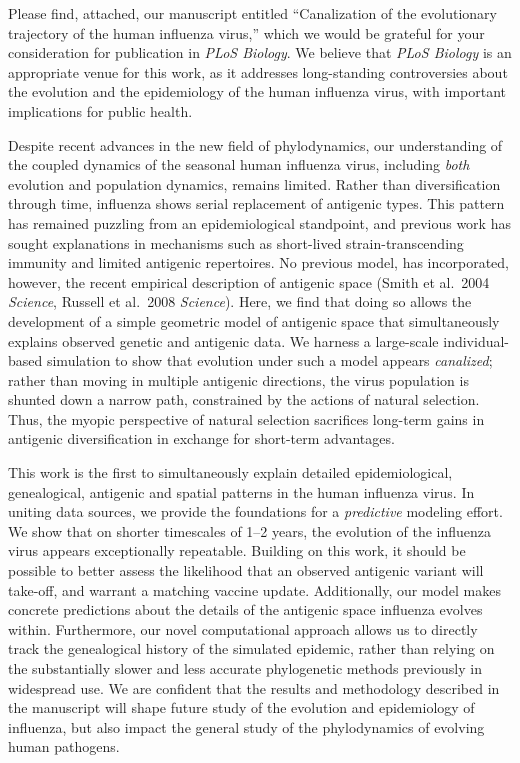 \documentclass[stdletter,letterpaper,addrfromright,orderfromdateto,dateleft,11pt,noaddrto,sigleft]{newlfm}
\begin{document}
\begin{newlfm}

Please find, attached, our manuscript entitled ``Canalization of the evolutionary trajectory of the human influenza virus,'' which we would be grateful for your consideration for publication in \textit{PLoS Biology}.  We believe that \textit{PLoS Biology} is an appropriate venue for this work, as it addresses long-standing controversies about the evolution and the epidemiology of the human influenza virus, with important implications for public health.

Despite recent advances in the new field of phylodynamics, our understanding of the coupled dynamics of the seasonal human influenza virus, including \textit{both} evolution and population dynamics, remains limited.  Rather than diversification through time, influenza shows serial replacement of antigenic types.  This pattern has remained puzzling from an epidemiological standpoint, and previous work has sought explanations in mechanisms such as short-lived strain-transcending immunity and limited antigenic repertoires.  No previous model, has incorporated, however, the recent empirical description of antigenic space (Smith et al.\ 2004 \textit{Science}, Russell et al.\ 2008 \textit{Science}).  Here, we find that doing so allows the development of a simple geometric model of antigenic space that simultaneously explains observed genetic and antigenic data.  We harness a large-scale individual-based simulation to show that evolution under such a model appears \textit{canalized}; rather than moving in multiple antigenic directions, the virus population is shunted down a narrow path, constrained by the actions of natural selection.  Thus, the myopic perspective of natural selection sacrifices long-term gains in antigenic diversification in exchange for short-term advantages.

This work is the first to simultaneously explain detailed epidemiological, genealogical, antigenic and spatial patterns in the human influenza virus.  In uniting data sources, we provide the foundations for a \textit{predictive} modeling effort.  We show that on shorter timescales of 1--2 years, the evolution of the influenza virus appears exceptionally repeatable.  Building on this work, it should be possible to better assess the likelihood that an observed antigenic variant will take-off, and warrant a matching vaccine update.  Additionally, our model makes concrete predictions about the details of the antigenic space influenza evolves within.  Furthermore, our novel computational approach allows us to directly track the genealogical history of the simulated epidemic, rather than relying on the substantially slower and less accurate phylogenetic methods previously in widespread use.  We are confident that the results and methodology described in the manuscript will shape future study of the evolution and epidemiology of influenza, but also impact the general study of the phylodynamics of evolving human pathogens.

\end{newlfm}
\end{document}
